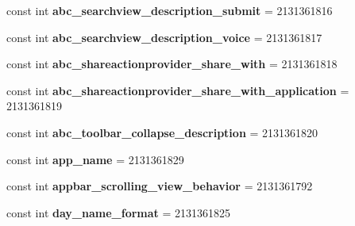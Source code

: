 \begin{DoxyCompactItemize}
\item 
\hypertarget{classClient_1_1Droid_1_1Resource_1_1String_ade1d2dbf65145c7687c8bb33c87fbd63}{}const int {\bfseries abc\+\_\+searchview\+\_\+description\+\_\+submit} = 2131361816\label{classClient_1_1Droid_1_1Resource_1_1String_ade1d2dbf65145c7687c8bb33c87fbd63}

\item 
\hypertarget{classClient_1_1Droid_1_1Resource_1_1String_a73c8f17bb442585c3bc7b3f76a868747}{}const int {\bfseries abc\+\_\+searchview\+\_\+description\+\_\+voice} = 2131361817\label{classClient_1_1Droid_1_1Resource_1_1String_a73c8f17bb442585c3bc7b3f76a868747}

\item 
\hypertarget{classClient_1_1Droid_1_1Resource_1_1String_adce6e8fe56bdbd59ed9ffbdb5f079877}{}const int {\bfseries abc\+\_\+shareactionprovider\+\_\+share\+\_\+with} = 2131361818\label{classClient_1_1Droid_1_1Resource_1_1String_adce6e8fe56bdbd59ed9ffbdb5f079877}

\item 
\hypertarget{classClient_1_1Droid_1_1Resource_1_1String_a821d32f06a913a423169275367f43f25}{}const int {\bfseries abc\+\_\+shareactionprovider\+\_\+share\+\_\+with\+\_\+application} = 2131361819\label{classClient_1_1Droid_1_1Resource_1_1String_a821d32f06a913a423169275367f43f25}

\item 
\hypertarget{classClient_1_1Droid_1_1Resource_1_1String_a217ea812fe4c356503523246f5479655}{}const int {\bfseries abc\+\_\+toolbar\+\_\+collapse\+\_\+description} = 2131361820\label{classClient_1_1Droid_1_1Resource_1_1String_a217ea812fe4c356503523246f5479655}

\item 
\hypertarget{classClient_1_1Droid_1_1Resource_1_1String_abcfde11d3c622fb4127083fc41cc3539}{}const int {\bfseries app\+\_\+name} = 2131361829\label{classClient_1_1Droid_1_1Resource_1_1String_abcfde11d3c622fb4127083fc41cc3539}

\item 
\hypertarget{classClient_1_1Droid_1_1Resource_1_1String_af86a9f906ab222682da4038619bf2111}{}const int {\bfseries appbar\+\_\+scrolling\+\_\+view\+\_\+behavior} = 2131361792\label{classClient_1_1Droid_1_1Resource_1_1String_af86a9f906ab222682da4038619bf2111}

\item 
\hypertarget{classClient_1_1Droid_1_1Resource_1_1String_a3e4d0436636391fcb52494eb9e18797d}{}const int {\bfseries day\+\_\+name\+\_\+format} = 2131361825\label{classClient_1_1Droid_1_1Resource_1_1String_a3e4d0436636391fcb52494eb9e18797d}


\end{DoxyCompactItemize}
